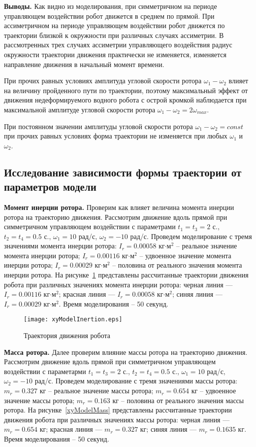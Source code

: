 \textbf{Выводы.} Как видно из моделирования, при симметричном на периоде управляющем воздействии робот движется в среднем по прямой. При ассиметричном на периоде управляющем воздействии робот движется по траектории близкой к окружности при различных случаях ассиметрии. В рассмотренных трех случаях ассиметрии управляющего воздействия радиус окружности траектории движения практически не изменяется, изменяется направление движения в начальный момент времени.

При прочих равных условиях амплитуда угловой скорости ротора $\omega_1 - \omega_2$ влияет на величину пройденного пути по траектории, поэтому максимальный эффект от движения недеформируемого водного робота с острой кромкой наблюдается при максимальной амплитуде угловой скорости ротора $\omega_1 - \omega_2 = 2\omega_{max}$.

При постоянном значении амплитуды угловой скорости ротора $\omega_1 - \omega_2 = const$ при прочих равных условиях форма траектории не изменяется при любых $\omega_1$ и $\omega_2$.


\subsection{Исследование зависимости формы траектории от параметров модели}

\textbf{Момент инерции ротора.} Проверим как влияет величина момента инерции ротора на траекторию движения. Рассмотрим движение вдоль прямой при симметричном управляющем воздействии с параметрами $t_1=t_3=2$ с., $t_2=t_4 = 0.5$ с., $\omega_1=10$ рад/с, $\omega_2=-10$ рад/с. Проведем моделирование с тремя значениями момента инерции ротора: $I_r = 0.00058$ кг$\cdot$м$^2$ -- реальное значение момента инерции ротора; $I_r = 0.00116$ кг$\cdot$м$^2$ -- удвоенное значение момента инерции ротора; $I_r = 0.00029$ кг$\cdot$м$^2$ -- половина от реального значения момента инерции ротора. На рисунке~\ref{xyModelInertion} представлены рассчитанные траектории движения робота при различных значениях момента инерции ротора: черная линия --- $I_r = 0.00116$ кг$\cdot$м$^2$; красная линия --- $I_r = 0.00058$ кг$\cdot$м$^2$; синяя линия --- $I_r = 0.00029$ кг$\cdot$м$^2$. Время моделирования -- 50 секунд.

\begin{figure}[!ht]
	\centering
	\texttt{[image: xyModelInertion.eps]}
	\caption{Траектория движения робота}
	\label{xyModelInertion}
\end{figure}

\textbf{Масса ротора.} Далее проверим влияние массы ротора на траекторию движения. Рассмотрим движение вдоль прямой при симметричном управляющем воздействии с параметарми $t_1=t_3=2$ с., $t_2=t_4 = 0.5$ с., $\omega_1=10$ рад/с, $\omega_2=-10$ рад/с. Проведем моделирование с тремя значениями массы ротора: $m_r = 0.327$ кг -- реальное значение массы ротора; $m_r = 0.654$ кг -- удвоенное значение массы ротора; $m_r = 0.163$ кг -- половина от реального значения массы ротора. На рисунке~\ref{xyModelMass} представлены рассчитанные траектории движения робота при различных значениях массы ротора: черная линия --- $m_r = 0.654$ кг; красная линия --- $m_r = 0.327$ кг; синяя линия --- $m_r = 0.1635$ кг. Время моделирования -- 50 секунд.

